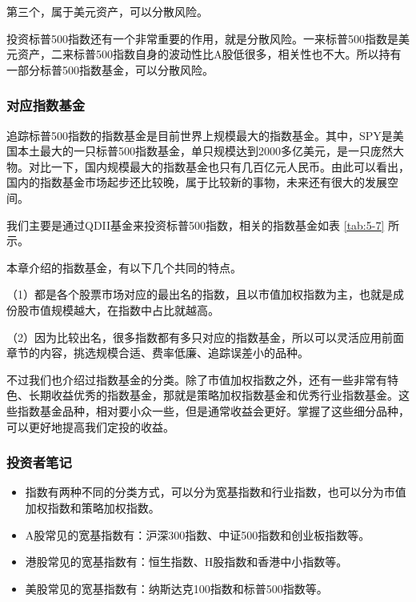 第三个，属于美元资产，可以分散风险。

投资标普500指数还有一个非常重要的作用，就是分散风险。一来标普500指数是美元资产，二来标普500指数自身的波动性比A股低很多，相关性也不大。所以持有一部分标普500指数基金，可以分散风险。

\subsubsection{对应指数基金}

追踪标普500指数的指数基金是目前世界上规模最大的指数基金。其中，SPY是美国本土最大的一只标普500指数基金，单只规模达到2000多亿美元，是一只庞然大物。对比一下，国内规模最大的指数基金也只有几百亿元人民币。由此可以看出，国内的指数基金市场起步还比较晚，属于比较新的事物，未来还有很大的发展空间。

我们主要是通过QDII基金来投资标普500指数，相关的指数基金如表 \ref{tab:5-7} 所示。





本章介绍的指数基金，有以下几个共同的特点。

（1）都是各个股票市场对应的最出名的指数，且以市值加权指数为主，也就是成份股市值规模越大，在指数中占比就越高。

（2）因为比较出名，很多指数都有多只对应的指数基金，所以可以灵活应用前面章节的内容，挑选规模合适、费率低廉、追踪误差小的品种。

不过我们也介绍过指数基金的分类。除了市值加权指数之外，还有一些非常有特色、长期收益优秀的指数基金，那就是策略加权指数基金和优秀行业指数基金。这些指数基金品种，相对要小众一些，但是通常收益会更好。掌握了这些细分品种，可以更好地提高我们定投的收益。

\subsubsection{投资者笔记}

\begin{itemize}
\item {\kaishu 指数有两种不同的分类方式，可以分为宽基指数和行业指数，也可以分为市值加权指数和策略加权指数。}
\item {\kaishu A股常见的宽基指数有：沪深300指数、中证500指数和创业板指数等。}
\item {\kaishu 港股常见的宽基指数有：恒生指数、H股指数和香港中小指数等。}
\item {\kaishu 美股常见的宽基指数有：纳斯达克100指数和标普500指数等。}
\end{itemize}
